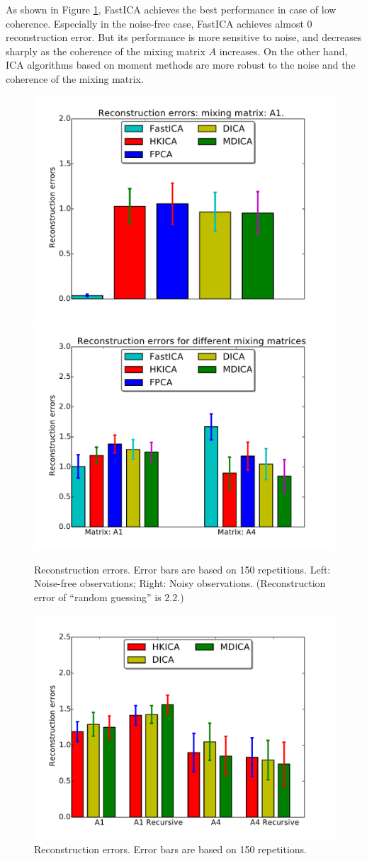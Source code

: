 \documentclass[11pt]{article}
\begin{document}
As shown in Figure \ref{fig:errorvscoherence}, FastICA achieves the best performance in case of low coherence.
Especially in the noise-free case, FastICA achieves almost 0 reconstruction error. 
But its performance is more sensitive to noise, and decreases sharply as the coherence of the mixing matrix $A$ increases. 
On the other hand, ICA algorithms based on moment methods are more robust to the noise and the coherence of the mixing matrix.
\begin{figure}[H] %
	\centering
	\includegraphics[width =0.48\columnwidth]{images/barchart-A1-noisefree}
	\includegraphics[width =0.48\columnwidth]{images/barchart-A1vsA4-noisy} 
	\caption{
		\label{fig:errorvscoherence}
		Reconstruction errors. Error bars are based on 150 repetitions. Left: Noise-free observations; Right: Noisy observations. (Reconstruction error of ``random guessing'' is $2.2$.)}
\end{figure}
\begin{figure}[H] %
	\centering
	\includegraphics[width =0.55\columnwidth]{images/barchart-recursive-noisy} 
	\caption{
		\label{fig:errorrecursive}
		Reconstruction errors. Error bars are based on 150 repetitions.}
\end{figure}
\end{document}
